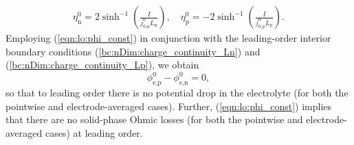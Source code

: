 \documentclass[a4paper]{article}
\newcommand{\add}{\color{black}}
\newcommand{\ts}[1]{_{\text{#1}}}
\begin{document}
\begin{align}\label{eqn:lo:eta}
  \eta\ts{n}^0 = 2\sinh^{-1}\left(\frac{I}{j\ts{$0$,n}^0L\ts{n}} \right), \quad \eta\ts{p}^0 =- 2\sinh^{-1}\left(\frac{I}{j\ts{0,p}^0L\ts{p}} \right).
\end{align}
Employing (\ref{eqn:lo:phi_const}) in conjunction with the leading-order interior boundary conditions (\ref{bc:nDim:charge_continuity_Ln}) and (\ref{bc:nDim:charge_continuity_Lp}), we obtain 
\begin{equation}\label{eqn:lo:concentration:overportential}
    \phi\ts{e,p}^0 - \phi\ts{e,n}^0 = 0,
\end{equation}
so {\add that} to leading order there is no potential drop in the electrolyte (for both the pointwise and electrode-averaged cases). Further, (\ref{eqn:lo:phi_const})  {\add implies} that there are no solid-phase Ohmic losses (for both the pointwise and electrode-averaged cases) at leading order.
\end{document}
